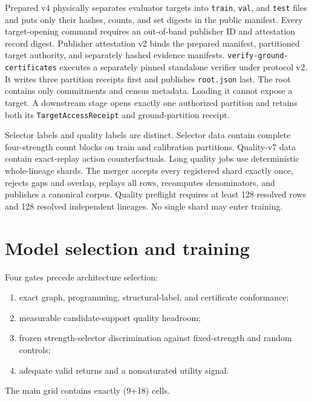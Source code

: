\documentclass[
  american,
  10pt,
  a4paper,
]{article}
\providecommand{\tightlist}{%
  \setlength{\itemsep}{0pt}\setlength{\parskip}{0pt}}
\begin{document}
Prepared v4 physically separates evaluator targets into \texttt{train},
\texttt{val}, and \texttt{test} files and puts only their hashes,
counts, and set digests in the public manifest. Every target-opening
command requires an out-of-band publisher ID and attestation record
digest. Publisher attestation v2 binds the prepared manifest,
partitioned target authority, and separately hashed evidence manifests.
\texttt{verify-ground-certificates} executes a separately pinned
standalone verifier under protocol v2. It writes three partition
receipts first and publishes \texttt{root.json} last. The root contains
only commitments and census metadata. Loading it cannot expose a target.
A downstream stage opens exactly one authorized partition and retains
both its \texttt{TargetAccessReceipt} and ground-partition receipt.

Selector labels and quality labels are distinct. Selector data contain
complete four-strength count blocks on train and calibration partitions.
Quality-v7 data contain exact-replay action counterfactuals. Long
quality jobs use deterministic whole-lineage shards. The merger accepts
every registered shard exactly once, rejects gaps and overlap, replays
all rows, recomputes denominators, and publishes a canonical corpus.
Quality preflight requires at least 128 resolved rows and 128 resolved
independent lineages. No single shard may enter training.

\section{Model selection and
training}\label{model-selection-and-training}

Four gates precede architecture selection:

\begin{enumerate}
\def\labelenumi{\arabic{enumi}.}
\tightlist
\item
  exact graph, programming, structural-label, and certificate
  conformance;
\item
  measurable candidate-support quality headroom;
\item
  frozen strength-selector discrimination against fixed-strength and
  random controls;
\item
  adequate valid returns and a nonsaturated utility signal.
\end{enumerate}

The main grid contains exactly (9+18) cells.
\end{document}
